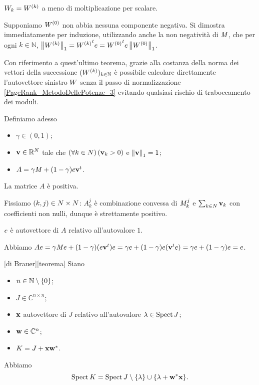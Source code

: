 $W_k = W^{(k)}$ a meno di moltiplicazione per scalare.
\par Supponiamo $W^{(0)}$ non abbia nessuna componente negativa.
Si dimostra immediatamente per induzione, utilizzando anche la non negativit\`a
di $\mathit{M}$, che per ogni $k \in \mathbb{N}$,
$\Norm{\Weights^{(k)}}[1]
= \Transposed{\Weights^{(k)}}\AllOnes
= \Transposed{\Weights^{(0)}}\AllOnes
\Norm{\Weights^{(0)}}[1]$. \EndProof
\par Con riferimento a quest'ultimo teorema, grazie alla costanza della
norma dei vettori della successione
$(W^{(k)})_{k \in \mathbb{N}}$
\`e possibile calcolare direttamente l'autovettore sinistro $W$
senza il passo di normalizzazione \ref{PageRank_MetodoDellePotenze_3}
evitando qualsiasi rischio di traboccamento dei moduli.
\par Definiamo adesso
\begin{itemize}
  \item $\gamma \in (0,1)$;
  \item $\mathbf{v} \in \mathbb{R}^N$ tale che
    $\left ( \forall k \in N \right ) \left ( \mathbf{v}_k > 0 \right )$ e
    $\Norm{\Vector}[1] = 1$;
  \item $A = \gamma\mathit{M} + (1 - \gamma)e{\mathbf{v}}^t$.
\end{itemize}
\begin{Theorem}
  La matrice $A$ \`e positiva.
\end{Theorem}
\Proof Fissiamo $(k,j) \in N \times N$:
$A_k^j$ \`e combinazione convessa di $\mathit{M}_k^j$ e
$\sum_{k \in N} \mathbf{v}_k$ con coefficienti non nulli,
dunque \`e strettamente positivo. \EndProof
\begin{Theorem}
  $e$ \`e autovettore di $A$ relativo all'autovalore $1$.
\end{Theorem}
\Proof Abbiamo
$Ae
= \gamma\mathit{M}e + (1 - \gamma)(e{\mathbf{v}}^t)e
= \gamma e
  + (1 - \gamma)e({\mathbf{v}}^te)
= \gamma e + (1 - \gamma)e
= e$. \EndProof
\begin{Theorem}
  [di Brauer][teorema]
  Siano
  \begin{itemize}
    \item $n \in \mathbb{N} \setminus \lbrace 0 \rbrace$;
    \item $J \in \mathbb{C}^{n \times n}$;
    \item $\Eigenvector$ autovettore di $J$ relativo all'autovalore
      $\lambda \in \operatorname{Spect}{J}$;
    \item $\mathbf{w} \in \mathbb{C}^n$;
    \item $K = J + \Eigenvector\HermitianTransposed{\VarVector}$.
  \end{itemize}
  Abbiamo
  \[
    \Spectrum{K}
    = \Spectrum{J}
      \SetMin \lbrace \Eigenvalue \rbrace
      \cup \lbrace \Eigenvalue + \HermitianTransposed{\VarVector}\Eigenvector \rbrace.
  \]
\end{Theorem}
